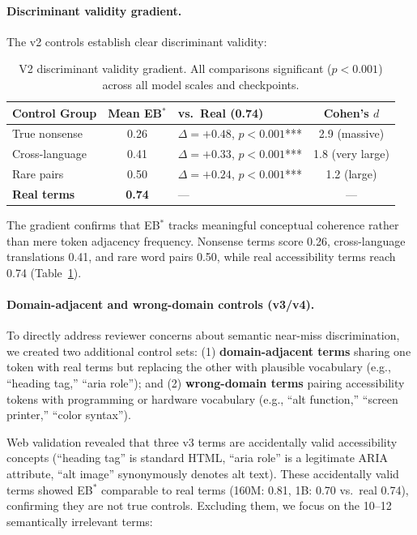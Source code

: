 \documentclass[10pt]{article} %
\begin{document}
\paragraph{Discriminant validity gradient.}
The v2 controls establish clear discriminant validity:

\begin{table}[h]
\centering
\small
\begin{tabular}{|l|c|l|c|}
\hline
\textbf{Control Group} & \textbf{Mean EB$^*$} & \textbf{vs.\ Real (0.74)} & \textbf{Cohen's $d$} \\
\hline
True nonsense & 0.26 & $\Delta=+0.48$, $p<0.001$*** & 2.9 (massive) \\
Cross-language & 0.41 & $\Delta=+0.33$, $p<0.001$*** & 1.8 (very large) \\
Rare pairs & 0.50 & $\Delta=+0.24$, $p<0.001$*** & 1.2 (large) \\
\textbf{Real terms} & \textbf{0.74} & --- & --- \\
\hline
\end{tabular}
\caption{V2 discriminant validity gradient. All comparisons significant ($p<0.001$) across all model scales and checkpoints.}
\label{tab:v2_gradient}
\end{table}

The gradient confirms that EB$^*$ tracks meaningful conceptual coherence rather than mere token adjacency frequency. Nonsense terms score 0.26, cross-language translations 0.41, and rare word pairs 0.50, while real accessibility terms reach 0.74 (Table~\ref{tab:v2_gradient}).

\paragraph{Domain-adjacent and wrong-domain controls (v3/v4).}
To directly address reviewer concerns about semantic near-miss discrimination, we created two additional control sets:
(1) \textbf{domain-adjacent terms} sharing one token with real terms but replacing the other with plausible vocabulary (e.g., ``heading tag,'' ``aria role''); and
(2) \textbf{wrong-domain terms} pairing accessibility tokens with programming or hardware vocabulary (e.g., ``alt function,'' ``screen printer,'' ``color syntax'').

Web validation revealed that three v3 terms are accidentally valid accessibility concepts (``heading tag'' is standard HTML, ``aria role'' is a legitimate ARIA attribute, ``alt image'' synonymously denotes alt text).
These accidentally valid terms showed EB$^*$ comparable to real terms (160M: 0.81, 1B: 0.70 vs.\ real 0.74), confirming they are not true controls.
Excluding them, we focus on the 10--12 semantically irrelevant terms:
\end{document}
